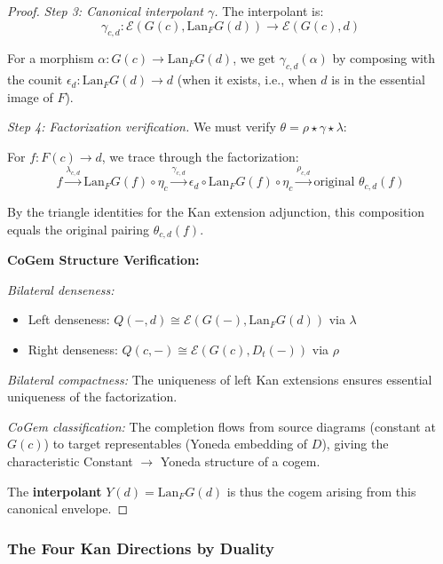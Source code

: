 \documentclass[11pt]{article}
\theoremstyle{plain}
\theoremstyle{definition}
\theoremstyle{remark}
\begin{document}
\begin{proof}
\emph{Step 3: Canonical interpolant $\gamma$.} The interpolant is:
\begin{equation}
\gamma_{c,d} : \mathcal{E}(G(c), \mathrm{Lan}_F G(d)) \to \mathcal{E}(G(c), d)
\end{equation}

For a morphism $\alpha : G(c) \to \mathrm{Lan}_F G(d)$, we get $\gamma_{c,d}(\alpha)$ by composing with the counit $\epsilon_d : \mathrm{Lan}_F G(d) \to d$ (when it exists, i.e., when $d$ is in the essential image of $F$).

\emph{Step 4: Factorization verification.} We must verify $\theta = \rho \star \gamma \star \lambda$:

For $f : F(c) \to d$, we trace through the factorization:
\begin{equation}
f \xrightarrow{\lambda_{c,d}} \mathrm{Lan}_F G(f) \circ \eta_c \xrightarrow{\gamma_{c,d}} \epsilon_d \circ \mathrm{Lan}_F G(f) \circ \eta_c \xrightarrow{\rho_{c,d}} \text{original } \theta_{c,d}(f)
\end{equation}

By the triangle identities for the Kan extension adjunction, this composition equals the original pairing $\theta_{c,d}(f)$.

\textbf{CoGem Structure Verification:}

\emph{Bilateral denseness:} 
\begin{itemize}
\item Left denseness: $Q(-, d) \cong \mathcal{E}(G(-), \mathrm{Lan}_F G(d))$ via $\lambda$
\item Right denseness: $Q(c, -) \cong \mathcal{E}(G(c), D_t(-))$ via $\rho$
\end{itemize}

\emph{Bilateral compactness:} The uniqueness of left Kan extensions ensures essential uniqueness of the factorization.

\emph{CoGem classification:} The completion flows from source diagrams (constant at $G(c)$) to target representables (Yoneda embedding of $D$), giving the characteristic Constant $\to$ Yoneda structure of a cogem.

The \textbf{interpolant} $Y(d) = \mathrm{Lan}_F G(d)$ is thus the cogem arising from this canonical envelope.
\end{proof}

\subsubsection{The Four Kan Directions by Duality}
\end{document}
